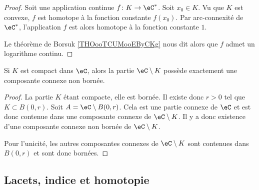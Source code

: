 \begin{proof}
	Soit une application continue \( f\colon K\to \eC^*\). Soit \( x_0\in K\). Vu que \( K\) est convexe, \( f\) est homotope à la fonction constante \( f(x_0)\). Par arc-connexité de \( \eC^*\), l'application \( f\) est alors homotope à la fonction constante \( 1\).

	Le théorème de Borsuk \ref{THOooTCUMooEByCKg} nous dit alors que \( f\) admet un logarithme continu.
\end{proof}

\begin{lemma}       \label{LEMooJNPTooScfSvA}
	Si \( K\) est compact dans \( \eC\), alors la partie \( \eC\setminus K\) possède exactement une composante connexe non bornée.
\end{lemma}

\begin{proof}
	La partie \( K\) étant compacte, elle est bornée. Il existe donc \( r>0\) tel que \( K\subset B(0,r)\). Soit \( A=\eC\setminus B(0,r)\). Cela est une partie connexe de \( \eC\) et est donc contenue dans une composante connexe de \( \eC\setminus K\). Il y a donc existence d'une composante connexe non bornée de \( \eC\setminus K\).

	Pour l'unicité, les autres composantes connexes de \( \eC\setminus K\) sont contenues dans \( B(0,r)\) et sont donc bornées.
\end{proof}

\subsection{Lacets, indice et homotopie}

